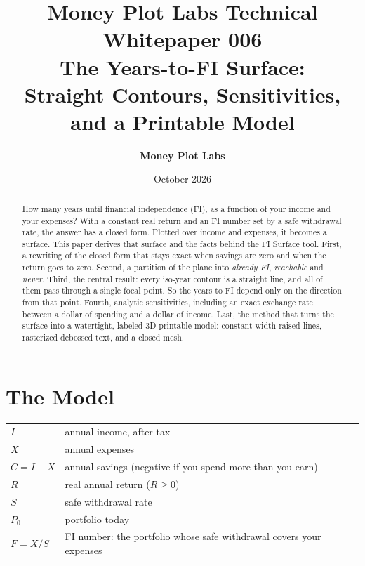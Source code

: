 \documentclass[11pt,letterpaper]{article}
\title{\vspace{-20pt}\textbf{\color{mpdark}Money Plot Labs Technical Whitepaper 006 \\
The Years-to-FI Surface: \\
Straight Contours, Sensitivities, and a Printable Model}}
\author{\textbf{Money Plot Labs}}
\date{October 2026}
\begin{document}
\maketitle

\begin{abstract}
\vspace{-5pt}
How many years until financial independence (FI), as a function of your income and your expenses? With a constant real return and an FI number set by a safe withdrawal rate, the answer has a closed form. Plotted over income and expenses, it becomes a surface. This paper derives that surface and the facts behind the FI Surface tool. First, a rewriting of the closed form that stays exact when savings are zero and when the return goes to zero. Second, a partition of the plane into \emph{already FI}, \emph{reachable} and \emph{never}. Third, the central result: every iso-year contour is a straight line, and all of them pass through a single focal point. So the years to FI depend only on the direction from that point. Fourth, analytic sensitivities, including an exact exchange rate between a dollar of spending and a dollar of income. Last, the method that turns the surface into a watertight, labeled 3D-printable model: constant-width raised lines, rasterized debossed text, and a closed mesh.
\end{abstract}

\section{The Model}

\begin{center}
\begin{tabular}{@{}ll@{}}
\toprule
$I$ & annual income, after tax \\
$X$ & annual expenses \\
$C = I - X$ & annual savings (negative if you spend more than you earn) \\
$R$ & real annual return ($R \ge 0$) \\
$S$ & safe withdrawal rate \\
$P_0$ & portfolio today \\
$F = X/S$ & FI number: the portfolio whose safe withdrawal covers your expenses \\
\bottomrule
\end{tabular}
\end{center}
\end{document}

